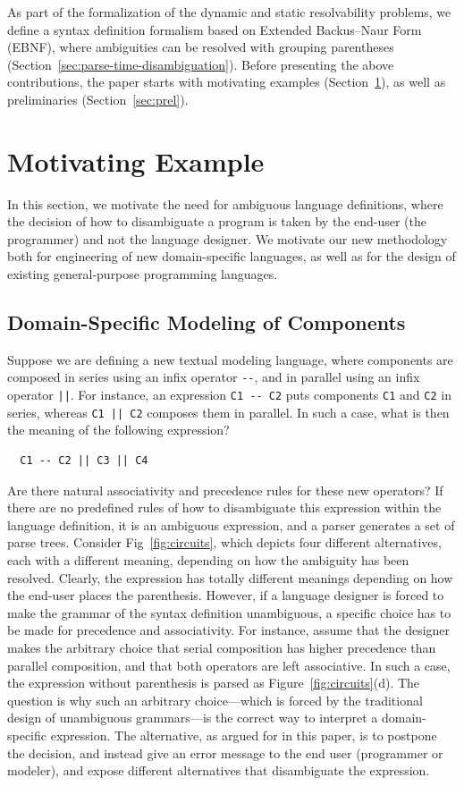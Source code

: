 \documentclass[acmsmall,review,anonymous]{acmart}\settopmatter{printfolios=true,printccs=false,printacmref=false}
\begin{document}
\noindent As part of the formalization of the dynamic and static resolvability problems, we define a syntax definition formalism based on Extended Backus–Naur Form (EBNF), where ambiguities can be resolved with grouping parentheses (Section~\ref{sec:parse-time-disambiguation}). Before presenting the above contributions, the paper starts with motivating examples (Section~\ref{sec:motivation}), as well as preliminaries (Section~\ref{sec:prel}).




\section{Motivating Example}
\label{sec:motivation}
In this section, we motivate the need for ambiguous language definitions, where the decision of how to disambiguate a program is taken by the end-user (the programmer) and not the language designer. We motivate our new methodology both for engineering of new domain-specific languages, as well as for the design of existing general-purpose programming languages.

\subsection{Domain-Specific Modeling of Components}
Suppose we are defining a new textual modeling language, where components are composed in series using an infix operator \verb~--~, and in parallel using an infix operator \verb~||~. For instance, an expression \verb~C1 -- C2~ puts components \verb~C1~ and \verb~C2~ in series, whereas \verb~C1 || C2~ composes them in parallel. In such a case, what is then the meaning of the following expression?
\begin{verbatim}
  C1 -- C2 || C3 || C4
\end{verbatim}

\noindent Are there natural associativity and precedence rules for these new operators? If there are no predefined rules of how to disambiguate this expression within the language definition, it is an ambiguous expression, and a parser generates a set of parse trees. Consider Fig~\ref{fig:circuits}, which depicts four different alternatives, each with a different meaning, depending on how the ambiguity has been resolved. Clearly, the expression has totally different meanings depending on how the end-user places the parenthesis. However, if a language designer is forced to make the grammar of the syntax definition unambiguous, a specific choice has to be made for precedence and associativity. For instance, assume that the designer makes the arbitrary choice that serial composition has higher precedence than parallel composition, and that both operators are left associative. In such a case, the expression without parenthesis is parsed as Figure~\ref{fig:circuits}(d). The question is why such an arbitrary choice---which is forced by the traditional design of unambiguous grammars---is the correct way to interpret a domain-specific expression. The alternative, as argued for in this paper, is to postpone the decision, and instead give an error message to the end user (programmer or modeler), and expose different alternatives that disambiguate the expression.
\end{document}

